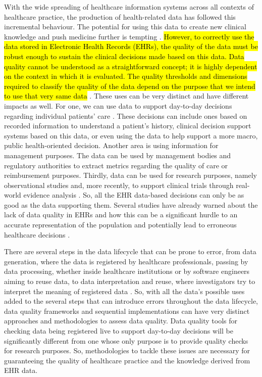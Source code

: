 With the wide spreading of healthcare information systems across all contexts of healthcare practice, the production of health-related data has followed this incremental behaviour. The potential for using this data to create new clinical knowledge and push medicine further is tempting \cite{martin-sanchezBigDataMedicine2014}.
\hl{However, to correctly use the data stored in Electronic Health Records (EHRs), the quality of the data must be robust enough to sustain the clinical decisions made based on this data. Data quality cannot be understood as a straightforward concept; it is highly dependent on the context in which it is evaluated. The quality thresholds and dimensions required to classify the quality of the data depend on the purpose that we intend to use that very same data} \cite{waljiElectronicHealthRecords2019}. These uses can be very distinct and have different impacts as well. For one, we can use data to support day-to-day decisions regarding individual patients' care \cite{verheijPossibleSourcesBias2018}. These decisions can include ones based on recorded information to understand a patient's history, clinical decision support systems based on this data, or even using the data to help support a more macro, public health-oriented decision. Another area is using information for management purposes. The data can be used by management bodies and regulatory authorities to extract metrics regarding the quality of care or reimbursement purposes. Thirdly, data can be used for research purposes, namely observational studies and, more recently, to support clinical trials through real-world evidence analysis \cite{coreyAssessingQualitySurgical2020,verheijPossibleSourcesBias2018,wengClinicalDataQuality2020}. 
So, all the EHR data-based decisions can only be as good as the data supporting them. Several studies have already warned about the lack of data quality in EHRs and how this can be a significant hurdle to an accurate representation of the population and potentially lead to erroneous healthcare decisions \cite{reimerDataQualityAssessment2016a,joukesImpactElectronicPaperBased2019a,huserMultisiteEvaluationData2016,zhangUnderstandingDetectingDefects2020,kramerImpactDataQuality2021,gigantiImpactDataQuality2019}.

There are several steps in the data lifecycle that can be prone to error, from data generation, where the data is registered by healthcare professionals, passing by data processing, whether inside healthcare institutions or by software engineers aiming to reuse data, to data interpretation and reuse, where investigators try to interpret the meaning of registered data \cite{wengClinicalDataQuality2020}.
So, with all the data's possible uses added to the several steps that can introduce errors throughout the data lifecycle, data quality frameworks and sequential implementations can have very distinct approaches and methodologies to assess data quality. Data quality tools for checking data being registered live to support day-to-day decisions will be significantly different from one whose only purpose is to provide quality checks for research purposes. So, methodologies to tackle these issues are necessary for guaranteeing the quality of healthcare practice and the knowledge derived from EHR data. 

